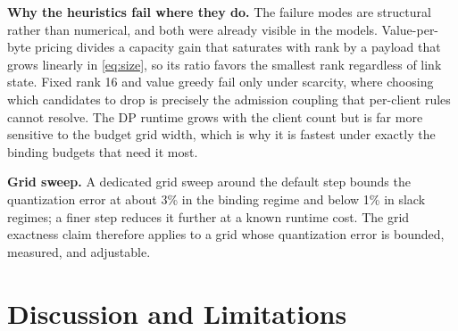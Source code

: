 \documentclass[a4paper,fleqn]{cas-dc}
\begin{document}
\par
\textbf{Why the heuristics fail where they do.} The failure modes are structural rather than numerical, and both were already visible in the models. Value-per-byte pricing divides a capacity gain that saturates with rank by a payload that grows linearly in \cref{eq:size}, so its ratio favors the smallest rank regardless of link state. Fixed rank 16 and value greedy fail only under scarcity, where choosing which candidates to drop is precisely the admission coupling that per-client rules cannot resolve. The DP runtime grows with the client count but is far more sensitive to the budget grid width, which is why it is fastest under exactly the binding budgets that need it most.
\par
\textbf{Grid sweep.} A dedicated grid sweep around the default step bounds the quantization error at about 3\% in the binding regime and below 1\% in slack regimes; a finer step reduces it further at a known runtime cost. The grid exactness claim therefore applies to a grid whose quantization error is bounded, measured, and adjustable.


\label{sec:rob}
\section{Discussion and Limitations}
\label{sec:discussion}
\end{document}

